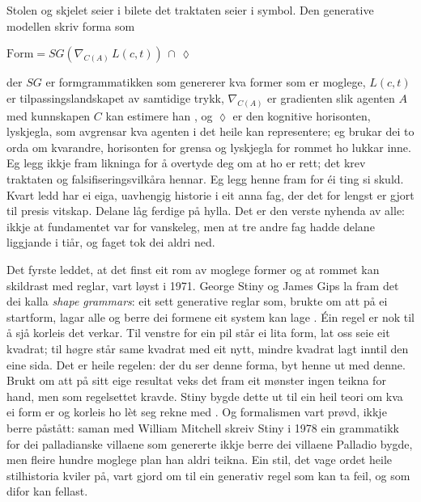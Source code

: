 Stolen og skjelet seier i bilete det traktaten seier i symbol. Den generative modellen skriv forma som

\begin{center}
\(\mathrm{Form} = SG\!\left(\nabla_{C(A)}\, L(c,t)\right) \,\cap\, \lozenge\)
\end{center}

der \(SG\) er formgrammatikken som genererer kva former som er moglege, \(L(c,t)\) er tilpassingslandskapet av samtidige trykk, \(\nabla_{C(A)}\) er gradienten slik agenten \(A\) med kunnskapen \(C\) kan estimere han \autocite{hatchuel2009}, og \(\lozenge\) er den kognitive horisonten, lyskjegla, som avgrensar kva agenten i det heile kan representere; eg brukar dei to orda om kvarandre, horisonten for grensa og lyskjegla for rommet ho lukkar inne. Eg legg ikkje fram likninga for å overtyde deg om at ho er rett; det krev traktaten og falsifiseringsvilkåra hennar. Eg legg henne fram for éi ting si skuld. Kvart ledd har ei eiga, uavhengig historie i eit anna fag, der det for lengst er gjort til presis vitskap. Delane låg ferdige på hylla. Det er den verste nyhenda av alle: ikkje at fundamentet var for vanskeleg, men at tre andre fag hadde delane liggjande i tiår, og faget tok dei aldri ned.

Det fyrste leddet, at det finst eit rom av moglege former og at rommet kan skildrast med reglar, vart løyst i 1971. George Stiny og James Gips la fram det dei kalla \emph{shape grammars}: eit sett generative reglar som, brukte om att på ei startform, lagar alle og berre dei formene eit system kan lage \autocite{stiny1972}. Éin regel er nok til å sjå korleis det verkar. Til venstre for ein pil står ei lita form, lat oss seie eit kvadrat; til høgre står same kvadrat med eit nytt, mindre kvadrat lagt inntil den eine sida. Det er heile regelen: der du ser denne forma, byt henne ut med denne. Brukt om att på sitt eige resultat veks det fram eit mønster ingen teikna for hand, men som regelsettet kravde. Stiny bygde dette ut til ein heil teori om kva ei form er og korleis ho lèt seg rekne med \autocite{stiny2006shape}. Og formalismen vart prøvd, ikkje berre påstått: saman med William Mitchell skreiv Stiny i 1978 ein grammatikk for dei palladianske villaene som genererte ikkje berre dei villaene Palladio bygde, men fleire hundre moglege plan han aldri teikna. Ein stil, det vage ordet heile stilhistoria kviler på, vart gjord om til ein generativ regel som kan ta feil, og som difor kan fellast.

